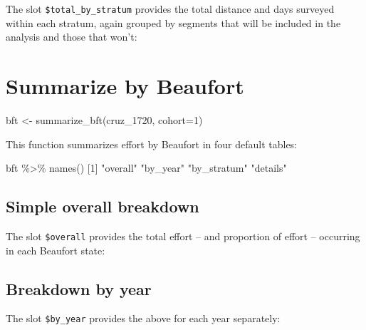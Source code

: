 \documentclass[
]{book}
\newenvironment{Shaded}{\begin{snugshade}}{\end{snugshade}}
\newcommand{\AttributeTok}[1]{\textcolor[rgb]{0.77,0.63,0.00}{#1}}
\newcommand{\DecValTok}[1]{\textcolor[rgb]{0.00,0.00,0.81}{#1}}
\newcommand{\FunctionTok}[1]{\textcolor[rgb]{0.00,0.00,0.00}{#1}}
\newcommand{\NormalTok}[1]{#1}
\newcommand{\OtherTok}[1]{\textcolor[rgb]{0.56,0.35,0.01}{#1}}
\newcommand{\SpecialCharTok}[1]{\textcolor[rgb]{0.00,0.00,0.00}{#1}}
\newcommand{\StringTok}[1]{\textcolor[rgb]{0.31,0.60,0.02}{#1}}
\begin{document}
The slot \texttt{\$total\_by\_stratum} provides the total distance and days surveyed within each stratum, again grouped by segments that will be included in the analysis and those that won't:

\hypertarget{summarize-by-beaufort}{%
\section*{Summarize by Beaufort}\label{summarize-by-beaufort}}

\begin{Shaded}
\begin{Highlighting}[]
\NormalTok{bft }\OtherTok{\textless{}{-}} \FunctionTok{summarize\_bft}\NormalTok{(cruz\_1720, }\AttributeTok{cohort=}\DecValTok{1}\NormalTok{)}
\end{Highlighting}
\end{Shaded}

This function summarizes effort by Beaufort in four default tables:

\begin{Shaded}
\begin{Highlighting}[]
\NormalTok{bft }\SpecialCharTok{\%\textgreater{}\%}  \FunctionTok{names}\NormalTok{()}
\NormalTok{[}\DecValTok{1}\NormalTok{] }\StringTok{"overall"}    \StringTok{"by\_year"}    \StringTok{"by\_stratum"} \StringTok{"details"}   
\end{Highlighting}
\end{Shaded}

\hypertarget{simple-overall-breakdown}{%
\subsection*{Simple overall breakdown}\label{simple-overall-breakdown}}

The slot \texttt{\$overall} provides the total effort -- and proportion of effort -- occurring in each Beaufort state:

\hypertarget{breakdown-by-year}{%
\subsection*{Breakdown by year}\label{breakdown-by-year}}

The slot \texttt{\$by\_year} provides the above for each year separately:
\end{document}
